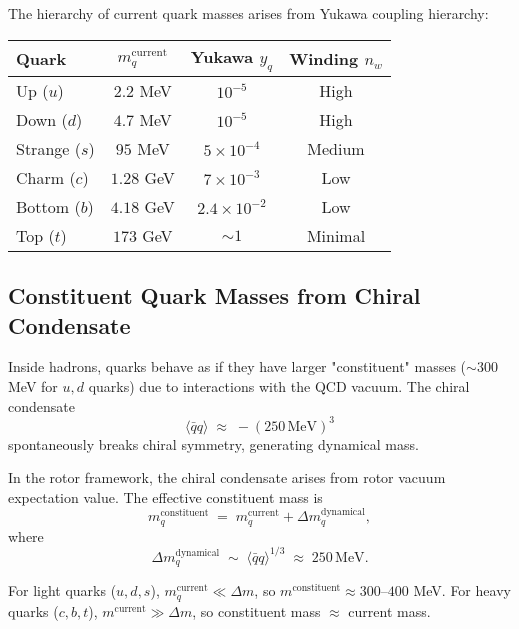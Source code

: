 \documentclass[11pt,a4paper]{article}
\theoremstyle{definition}
\theoremstyle{plain}
\theoremstyle{remark}
\begin{document}
The hierarchy of current quark masses arises from Yukawa coupling hierarchy:
\begin{center}
\begin{tabular}{lccc}
\toprule
Quark & $m_q^{\mathrm{current}}$ & Yukawa $y_q$ & Winding $n_w$ \\
\midrule
Up ($u$)     & $2.2$ MeV   & $10^{-5}$ & High \\
Down ($d$)   & $4.7$ MeV   & $10^{-5}$ & High \\
Strange ($s$)& $95$ MeV    & $5 \times 10^{-4}$ & Medium \\
Charm ($c$)  & $1.28$ GeV  & $7 \times 10^{-3}$ & Low \\
Bottom ($b$) & $4.18$ GeV  & $2.4 \times 10^{-2}$ & Low \\
Top ($t$)    & $173$ GeV   & $\sim 1$ & Minimal \\
\bottomrule
\end{tabular}
\end{center}

\subsection{Constituent Quark Masses from Chiral Condensate}

Inside hadrons, quarks behave as if they have larger "constituent" masses ($\sim 300$ MeV for $u,d$ quarks) due to interactions with the QCD vacuum. The chiral condensate
\begin{equation}
\langle \bar{q}q \rangle \;\approx\; -(250\,\text{MeV})^3
\end{equation}
spontaneously breaks chiral symmetry, generating dynamical mass.

In the rotor framework, the chiral condensate arises from rotor vacuum expectation value. The effective constituent mass is
\begin{equation}
m_q^{\mathrm{constituent}} \;=\; m_q^{\mathrm{current}} + \Delta m_q^{\mathrm{dynamical}},
\end{equation}
where
\begin{equation}
\Delta m_q^{\mathrm{dynamical}} \;\sim\; \langle \bar{q}q \rangle^{1/3} \;\approx\; 250\,\text{MeV}.
\end{equation}

For light quarks ($u,d,s$), $m_q^{\mathrm{current}} \ll \Delta m$, so $m^{\mathrm{constituent}} \approx 300$--$400$ MeV. For heavy quarks ($c,b,t$), $m^{\mathrm{current}} \gg \Delta m$, so constituent mass $\approx$ current mass.
\end{document}
